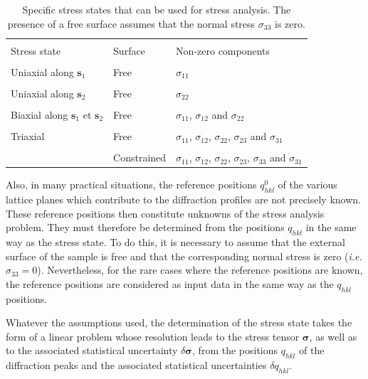 \documentclass[french,a4paper]{report}
\begin{document}
\begin{table}
\centering
\begin{tabular}{lll}
\hline
\hline
\\[-1em]
Stress state & Surface & Non-zero components\\
\hline
\\[-1em]
Uniaxial along $\boldsymbol s_1$ & Free & $\sigma_{11}$ \\
\hline
\\[-1em]
Uniaxial along $\boldsymbol s_2$ & Free & $\sigma_{22}$ \\
\hline
\\[-1em]
Biaxial along $\boldsymbol s_1$ et $\boldsymbol s_2$ & Free & $\sigma_{11}$, $\sigma_{12}$ and $\sigma_{22}$ \\
\hline
\\[-1em]
Triaxial & Free & $\sigma_{11}$, $\sigma_{12}$, $\sigma_{22}$, $\sigma_{23}$ and $\sigma_{31}$\\
\\[-1em]
 & Constrained & $\sigma_{11}$, $\sigma_{12}$, $\sigma_{22}$, $\sigma_{23}$, $\sigma_{33}$ and $\sigma_{31}$\\
\hline
\hline
\end{tabular}
\caption{Specific stress states that can be used for stress analysis. The presence of a free surface assumes that the normal stress $\sigma_{33}$ is zero.}
\label{tab_contrainte}
\end{table}

Also, in many practical situations, the reference positions $q^0_{hkl}$ of the various lattice planes which contribute to the diffraction profiles are not precisely known. These reference positions then constitute unknowns of the stress analysis problem. They must therefore be determined from the positions $q_{hkl}$ in the same way as the stress state. To do this, it is necessary to assume that the external surface of the sample is free and that the corresponding normal stress is zero (\textit{i.e.} $\sigma_{33}=0$). Nevertheless, for the rare cases where the reference positions are known, the reference positions are considered as input data in the same way as the $q_{hkl}$ positions.

Whatever the assumptions used, the determination of the stress state takes the form of a linear problem whose resolution leads to the stress tensor $\boldsymbol \sigma$, as well as to the associated statistical uncertainty $\delta \boldsymbol \sigma$, from the positions $q_{hkl}$ of the diffraction peaks and the associated statistical uncertainties $\delta q_{hkl}$.
\end{document}
